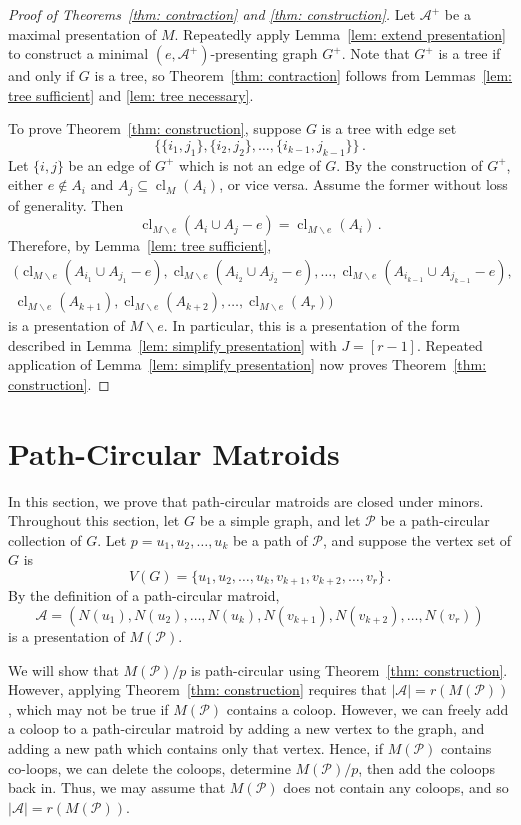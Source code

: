 \documentclass[11pt, reqno]{amsart}
\DeclareMathOperator{\cl}{cl}
\begin{document}
\begin{proof}[Proof of Theorems~\ref{thm: contraction} and \ref{thm: construction}]
Let $\mathcal A^+$ be a maximal presentation of $M$. Repeatedly apply Lemma~\ref{lem: extend presentation} to construct a minimal $(e, \mathcal A^+)$-presenting graph $G^+$. Note that $G^+$ is a tree if and only if $G$ is a tree, so Theorem~\ref{thm: contraction} follows from Lemmas~\ref{lem: tree sufficient} and \ref{lem: tree necessary}.

To prove Theorem~\ref{thm: construction}, suppose $G$ is a tree with edge set
$$
\{\{i_1,j_1\},\{i_2,j_2\},\ldots,\{i_{k-1},j_{k-1}\}\} \,.
$$
Let $\{i,j\}$ be an edge of $G^+$ which is not an edge of $G$. By the construction of $G^+$, either $e \notin A_i$ and $A_j \subseteq \cl_M(A_i)$, or vice versa. Assume the former without loss of generality. Then
$$
\cl_{M \backslash e}(A_i \cup A_j - e) = \cl_{M \backslash e}(A_i) \,.
$$
Therefore, by Lemma~\ref{lem: tree sufficient},
\begin{align*}
(\cl_{M \backslash e}(A_{i_1} \cup A_{j_1} - e), \cl_{M \backslash e}(A_{i_2} \cup A_{j_2} - e), \ldots, \cl_{M \backslash e}(A_{i_{k-1}} \cup A_{j_{k-1}} - e), \\
\cl_{M \backslash e}(A_{k+1}), \cl_{M \backslash e}(A_{k+2}), \ldots, \cl_{M \backslash e}(A_r))
\end{align*}
is a presentation of $M \backslash e$. In particular, this is a presentation of the form described in Lemma~\ref{lem: simplify presentation} with $J = [r-1]$. Repeated application of Lemma~\ref{lem: simplify presentation} now proves Theorem~\ref{thm: construction}.
\end{proof}

\section{Path-Circular Matroids} \label{minorclosed}

In this section, we prove that path-circular matroids are closed under minors. Throughout this section, let $G$ be a simple graph, and let $\mathcal P$ be a path-circular collection of $G$. Let $p = u_1,u_2,\ldots,u_k$ be a path of $\mathcal P$, and suppose the vertex set of $G$ is 
$$
V(G) = \{u_1,u_2,\ldots,u_k,v_{k+1},v_{k+2},\ldots,v_r\} \,.
$$  
By the definition of a path-circular matroid, 
$$
\mathcal A = (N(u_1),N(u_2),\ldots,N(u_k),N(v_{k+1}),N(v_{k+2}),\ldots,N(v_r))
$$ 
is a presentation of $M(\mathcal P)$. 

We will show that $M(\mathcal P)/p$ is path-circular using Theorem~\ref{thm: construction}. However, applying Theorem~\ref{thm: construction} requires that $|\mathcal A| = r(M(\mathcal P))$, which may not be true if $M(\mathcal P)$ contains a coloop. However, we can freely add a coloop to a path-circular matroid by adding a new vertex to the graph, and adding a new path which contains only that vertex. Hence, if $M(\mathcal P)$ contains co-loops, we can delete the coloops, determine $M(\mathcal P) / p$, then add the coloops back in. Thus, we may assume that $M(\mathcal P)$ does not contain any coloops, and so $|\mathcal A| = r(M(\mathcal P))$.
\end{document}
